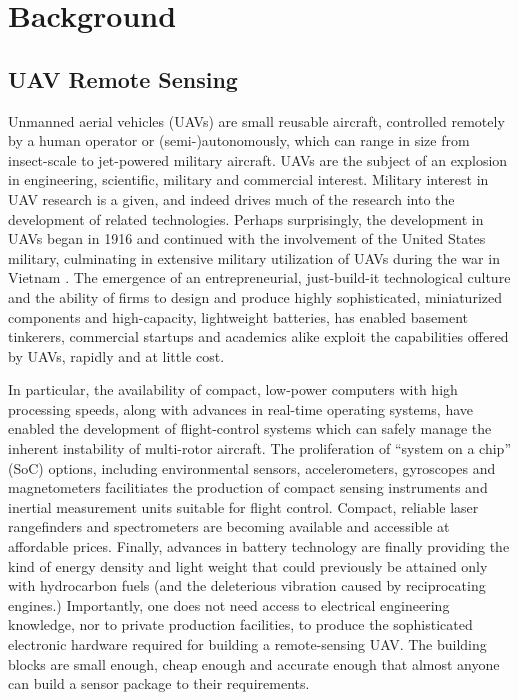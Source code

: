\documentclass[10pt]{article}
\begin{document}
\section{Background}

\subsection{UAV Remote Sensing}

Unmanned aerial vehicles (UAVs) are small reusable aircraft, controlled remotely by a human operator or (semi-)autonomously, which can range in size from insect-scale \cite{Avadhanula2002,Deng2003} to jet-powered military aircraft. UAVs are the subject of an explosion in engineering, scientific, military and commercial interest. Military interest in UAV research is a given, and indeed drives much of the research into the development of related technologies. Perhaps surprisingly, the development in UAVs began in 1916 and continued with the involvement of the United States military, culminating in extensive military utilization of UAVs during the war in Vietnam \cite{Valavanis2007,Cook2007}. The emergence of an entrepreneurial, just-build-it technological culture and the ability of firms to design and produce highly sophisticated, miniaturized components and high-capacity, lightweight batteries, has enabled basement tinkerers, commercial startups and academics alike exploit the capabilities offered by UAVs, rapidly and at little cost.

In particular, the availability of compact, low-power computers with high processing speeds, along with advances in real-time operating systems, have enabled the development of flight-control systems which can safely manage the inherent instability of multi-rotor aircraft. The proliferation of ``system on a chip'' (SoC) options, including environmental sensors, accelerometers, gyroscopes and magnetometers facilitiates the production of compact sensing instruments and inertial measurement units suitable for flight control. Compact, reliable laser rangefinders and spectrometers are becoming available and accessible at affordable prices. Finally, advances in battery technology are finally providing the kind of energy density and light weight that could previously be attained only with hydrocarbon fuels (and the deleterious vibration caused by reciprocating engines.) Importantly, one does not need access to electrical engineering knowledge, nor to private production facilities, to produce the sophisticated electronic hardware required for building a remote-sensing UAV. The building blocks are small enough, cheap enough and accurate enough that almost anyone can build a sensor package to their requirements.
\end{document}
